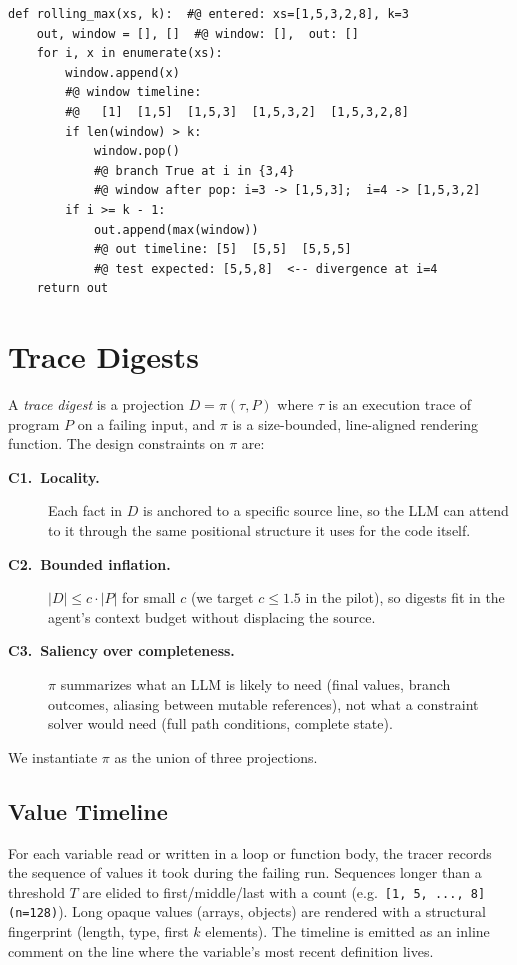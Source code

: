 \documentclass[sigconf,review,anonymous,nonacm]{acmart}
\begin{document}
\begin{lstlisting}[caption={Source augmented with a trace digest. Comments
prefixed \texttt{\#@} are emitted by the tracer and inserted only in the
agent's view of the source.},label={lst:digest}]
def rolling_max(xs, k):  #@ entered: xs=[1,5,3,2,8], k=3
    out, window = [], []  #@ window: [],  out: []
    for i, x in enumerate(xs):
        window.append(x)
        #@ window timeline:
        #@   [1]  [1,5]  [1,5,3]  [1,5,3,2]  [1,5,3,2,8]
        if len(window) > k:
            window.pop()
            #@ branch True at i in {3,4}
            #@ window after pop: i=3 -> [1,5,3];  i=4 -> [1,5,3,2]
        if i >= k - 1:
            out.append(max(window))
            #@ out timeline: [5]  [5,5]  [5,5,5]
            #@ test expected: [5,5,8]  <-- divergence at i=4
    return out
\end{lstlisting}

\section{Trace Digests}
\label{sec:approach}

A \emph{trace digest} is a projection $D = \pi(\tau, P)$ where $\tau$ is an
execution trace of program $P$ on a failing input, and $\pi$ is a
size-bounded, line-aligned rendering function. The design constraints on
$\pi$ are:

\begin{description}
\item[\textbf{C1.\ Locality.}] Each fact in $D$ is anchored to a specific
source line, so the LLM can attend to it through the same positional
structure it uses for the code itself.
\item[\textbf{C2.\ Bounded inflation.}] $|D| \leq c \cdot |P|$ for small
$c$ (we target $c \leq 1.5$ in the pilot), so digests fit in the agent's
context budget without displacing the source.
\item[\textbf{C3.\ Saliency over completeness.}] $\pi$ summarizes what an
LLM is likely to need (final values, branch outcomes, aliasing between
mutable references), not what a constraint solver would need (full path
conditions, complete state).
\end{description}

We instantiate $\pi$ as the union of three projections.

\subsection{Value Timeline}
For each variable read or written in a loop or function body, the tracer
records the sequence of values it took during the failing run. Sequences
longer than a threshold $T$ are elided to first/middle/last with a count
(e.g.\ \verb|[1, 5, ..., 8] (n=128)|). Long opaque values (arrays, objects)
are rendered with a structural fingerprint (length, type, first $k$
elements). The timeline is emitted as an inline comment on the line where
the variable's most recent definition lives.
\end{document}
